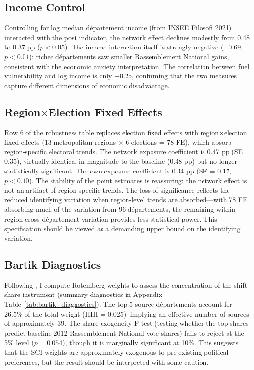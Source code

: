 \documentclass[12pt]{article}
\newcommand{\rn}{Rassemblement National}
\newcommand{\dept}{d\'{e}partement}
\newcommand{\depts}{d\'{e}partements}
\begin{document}
\subsection{Income Control}

Controlling for log median \dept{} income (from INSEE Filosofi 2021) interacted with the post indicator, the network effect declines modestly from 0.48 to 0.37 pp ($p < 0.05$). The income interaction itself is strongly negative ($-0.69$, $p < 0.01$): richer \depts{} saw smaller \rn{} gains, consistent with the economic anxiety interpretation. The correlation between fuel vulnerability and log income is only $-0.25$, confirming that the two measures capture different dimensions of economic disadvantage.

\subsection{Region$\times$Election Fixed Effects}

Row 6 of the robustness table replaces election fixed effects with region$\times$election fixed effects (13 metropolitan regions $\times$ 6 elections = 78 FE), which absorb region-specific electoral trends. The network exposure coefficient is 0.47 pp (SE = 0.35), virtually identical in magnitude to the baseline (0.48 pp) but no longer statistically significant. The own-exposure coefficient is 0.34 pp (SE = 0.17, $p < 0.10$). The stability of the point estimates is reassuring: the network effect is not an artifact of region-specific trends. The loss of significance reflects the reduced identifying variation when region-level trends are absorbed---with 78 FE absorbing much of the variation from 96 \depts{}, the remaining within-region cross-\dept{} variation provides less statistical power. This specification should be viewed as a demanding upper bound on the identifying variation.

\subsection{Bartik Diagnostics}

Following \citet{goldsmith2020bartik}, I compute Rotemberg weights to assess the concentration of the shift-share instrument (summary diagnostics in Appendix Table~\ref{tab:bartik_diagnostics}). The top-5 source \depts{} account for 26.5\% of the total weight (HHI = 0.025), implying an effective number of sources of approximately 39. The share exogeneity F-test (testing whether the top shares predict baseline 2012 \rn{} vote shares) fails to reject at the 5\% level ($p = 0.054$), though it is marginally significant at 10\%. This suggests that the SCI weights are approximately exogenous to pre-existing political preferences, but the result should be interpreted with some caution.
\end{document}
